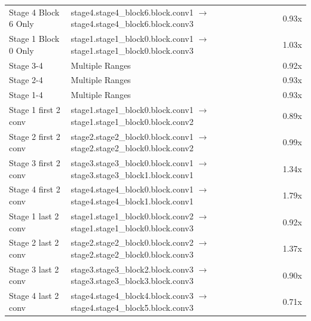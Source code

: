 \begin{table}[h]
\begin{tabular}{llc}
Stage 4 Block 6 Only & stage4.stage4\_block6.block.conv1 $\to$ stage4.stage4\_block6.block.conv3 & 0.93x \\
Stage 1 Block 0 Only & stage1.stage1\_block0.block.conv1 $\to$ stage1.stage1\_block0.block.conv3 & 1.03x \\
Stage 3-4 & Multiple Ranges & 0.92x \\
Stage 2-4 & Multiple Ranges & 0.93x \\
Stage 1-4 & Multiple Ranges & 0.93x \\
Stage 1 first 2 conv & stage1.stage1\_block0.block.conv1 $\to$ stage1.stage1\_block0.block.conv2 & 0.89x \\
Stage 2 first 2 conv & stage2.stage2\_block0.block.conv1 $\to$ stage2.stage2\_block0.block.conv2 & 0.99x \\
Stage 3 first 2 conv & stage3.stage3\_block0.block.conv1 $\to$ stage3.stage3\_block1.block.conv1 & 1.34x \\
Stage 4 first 2 conv & stage4.stage4\_block0.block.conv1 $\to$ stage4.stage4\_block1.block.conv1 & 1.79x \\
Stage 1 last 2 conv & stage1.stage1\_block0.block.conv2 $\to$ stage1.stage1\_block0.block.conv3 & 0.92x \\
Stage 2 last 2 conv & stage2.stage2\_block0.block.conv2 $\to$ stage2.stage2\_block0.block.conv3 & 1.37x \\
Stage 3 last 2 conv & stage3.stage3\_block2.block.conv3 $\to$ stage3.stage3\_block3.block.conv3 & 0.90x \\
Stage 4 last 2 conv & stage4.stage4\_block4.block.conv3 $\to$ stage4.stage4\_block5.block.conv3 & 0.71x \\
\bottomrule
\end{tabular}
\end{table}

